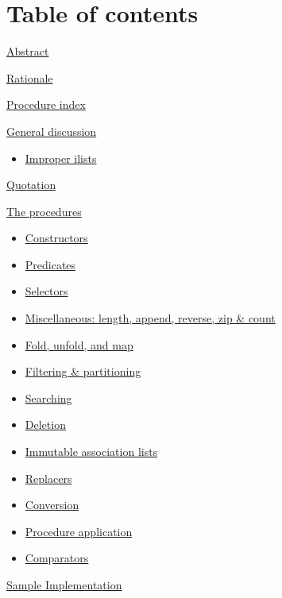 \section{Table of contents}\label{table-of-contents}

\protect\hyperlink{Abstract}{Abstract}

\protect\hyperlink{Rationale}{Rationale}

\protect\hyperlink{ProcedureIndex}{Procedure index}

\protect\hyperlink{GeneralDiscussion}{General discussion}

\begin{itemize}
\tightlist
\item
  \protect\hyperlink{ImproperIlists}{Improper ilists}
\end{itemize}

\protect\hyperlink{Quotation}{Quotation}

\protect\hyperlink{TheProcedures}{The procedures}

\begin{itemize}
\tightlist
\item
  \protect\hyperlink{Constructors}{Constructors}
\item
  \protect\hyperlink{Predicates}{Predicates}
\item
  \protect\hyperlink{Selectors}{Selectors}
\item
  \protect\hyperlink{Miscellaneous}{Miscellaneous: length, append,
  reverse, zip \& count}
\item
  \protect\hyperlink{FoldUnfoldMap}{Fold, unfold, and map}
\item
  \protect\hyperlink{FilteringPartitioning}{Filtering \& partitioning}
\item
  \protect\hyperlink{Searching}{Searching}
\item
  \protect\hyperlink{Deletion}{Deletion}
\item
  \protect\hyperlink{ImmutableassociationLists}{Immutable association
  lists}
\item
  \protect\hyperlink{Replacers}{Replacers}
\item
  \protect\hyperlink{Conversion}{Conversion}
\item
  \protect\hyperlink{ProcedureApplication}{Procedure application}
\item
  \protect\hyperlink{Comparators}{Comparators}
\end{itemize}

\protect\hyperlink{SampleImplementation}{Sample Implementation}

